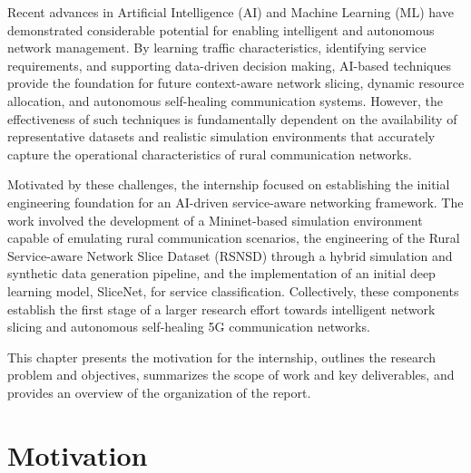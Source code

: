\documentclass[12pt,a4paper]{report}
\begin{document}
	Recent advances in Artificial Intelligence (AI) and Machine Learning (ML) have demonstrated considerable potential for enabling intelligent and autonomous network management. By learning traffic characteristics, identifying service requirements, and supporting data-driven decision making, AI-based techniques provide the foundation for future context-aware network slicing, dynamic resource allocation, and autonomous self-healing communication systems. However, the effectiveness of such techniques is fundamentally dependent on the availability of representative datasets and realistic simulation environments that accurately capture the operational characteristics of rural communication networks.
	
	Motivated by these challenges, the internship focused on establishing the initial engineering foundation for an AI-driven service-aware networking framework. The work involved the development of a Mininet-based simulation environment capable of emulating rural communication scenarios, the engineering of the Rural Service-aware Network Slice Dataset (RSNSD) through a hybrid simulation and synthetic data generation pipeline, and the implementation of an initial deep learning model, SliceNet, for service classification. Collectively, these components establish the first stage of a larger research effort towards intelligent network slicing and autonomous self-healing 5G communication networks.
	
	This chapter presents the motivation for the internship, outlines the research problem and objectives, summarizes the scope of work and key deliverables, and provides an overview of the organization of the report.
	
	
	\section{Motivation}
	\label{sec:motivation}
	

	
\end{document}
